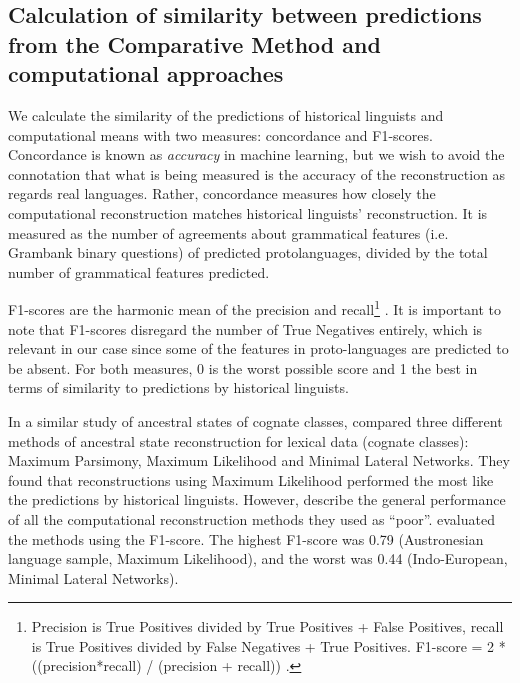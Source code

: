 \documentclass[a4paper,10pt]{article} %
\begin{document}
 
\subsection{Calculation of similarity between predictions from the Comparative Method and computational approaches}
\label{result_calc_section}
We calculate the similarity of the predictions of historical linguists and computational means with two measures: concordance and F1-scores. Concordance is known as \textit{accuracy} in machine learning, but we wish to avoid the connotation that what is being measured is the accuracy of the reconstruction as regards real languages. Rather, concordance measures how closely the computational reconstruction matches historical linguists' reconstruction. It is measured as the number of agreements about grammatical features (i.e. Grambank binary questions) of predicted protolanguages, divided by the total number of grammatical features predicted. 

F1-scores are the harmonic mean of the precision and recall\footnote{Precision is True Positives divided by True Positives + False Positives, recall is True Positives divided by False Negatives + True Positives. F1-score = 2 * ((precision*recall) / (precision + recall)) \citep{van1979information}.} \citep[133]{van1979information}. It is important to note that F1-scores disregard the number of True Negatives entirely, which is relevant in our case since some of the features in proto-languages are predicted to be absent. For both measures, 0 is the worst possible score and 1 the best in terms of similarity to predictions by historical linguists. 

In a similar study of ancestral states of cognate classes, \citet{jager2018using} compared three different methods of ancestral state reconstruction for lexical data (cognate classes): Maximum Parsimony, Maximum Likelihood and Minimal Lateral Networks. They found that reconstructions using Maximum Likelihood performed the most like the predictions by historical linguists. However, \citet{jager2018using} describe the general performance of all the computational reconstruction methods they used as ``poor''.  \citet{jager2018using} evaluated the methods using the F1-score. The highest F1-score was 0.79 (Austronesian language sample, Maximum Likelihood), and the worst was 0.44 (Indo-European, Minimal Lateral Networks).
\end{document}
